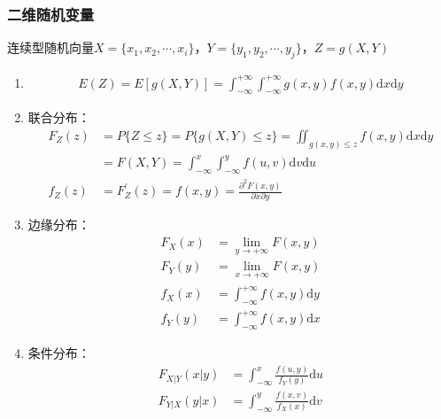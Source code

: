 \documentclass[12pt]{book}
\begin{document}
\subsubsection{二维随机变量}

连续型随机向量$X=\{x_1,x_2,\cdots,x_i\}$，$Y=\{y_1,y_2,\cdots,y_j\}$，$Z=g(X,Y)$

\begin{enumerate}[1.]
    \item \begin{gather*}
        E(Z) = E[g(X,Y)]
        = \int_{-\infty}^{+\infty}\int_{-\infty}^{+\infty}{g(x,y)f(x,y)\mathrm{d}x \mathrm{d}y}
    \end{gather*}
    \item 联合分布：
	\begin{align*}
        F_{Z}(z) &= P\{Z\leqslant z\}
        = P\{g(X,Y)\leqslant z\} 
        = \iint_{g(x,y)\leqslant z}{f(x,y)\mathrm{d}x\mathrm{d}y} \\
        &= F(X,Y) 
        = \int_{-\infty}^{x}\int_{-\infty}^{y}{ f(u,v) \mathrm{d}v \mathrm{d}u }  \\
        f_{Z}(z) &= F_{Z}^{\prime}{(z)} = f(x,y) = \frac{\partial^2F\left(x,y\right)}{\partial x\partial y}
        \end{align*}
    \item 边缘分布：
    \begin{align*}
        F_{X}(x)&=\lim_{y\rightarrow+\infty} F(x,y) \\
        F_{Y}(y)&=\lim_{x\rightarrow+\infty} F(x,y) \\
        f_{X}(x)&=\int_{-\infty}^{+\infty}f\left(x,y\right) \mathrm{d}y \\
        f_{Y}(y)&=\int_{-\infty}^{+\infty}f(x,y)\mathrm{d}x
    \end{align*}
    \item 条件分布：
    \begin{align*}
        F_{X|Y}(x|y)& = \int_{-\infty}^{x}{ \frac{f(u,y)}{f_{Y}(y)}\mathrm{d}u } \\
        F_{Y|X}(y|x) &= \int_{-\infty}^{y}{ \frac{f(x,v)}{f_{X}(x)}\mathrm{d}v } \\

\end{align*}
\end{enumerate}
\end{document}
